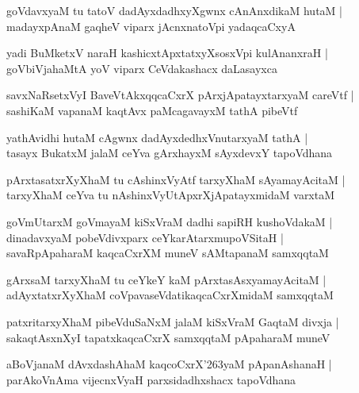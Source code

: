 \begin{shloka}
goVdavxyaM tu tatoV dadAyxdadhxyXgwnx cAnAnxdikaM hutaM |\\
madayxpAnaM gaqheV viparx jAcnxnatoVpi yadaqcaCxyA 
\end{shloka}

\begin{shloka}
yadi BuMketxV naraH kashicxtApxtatxyXsosxVpi kulAnanxraH |\\
goVbiVja{ha}MtA yoV viparx CeVdakashacx daLasayxca
\end{shloka}

\begin{shloka}
savxNaRsetxVyI BaveVtAkxqqcaCxrX pArxjApatayxtarxyaM careVtf |\\
sashiKaM vapanaM kaqtAvx paMcagavayxM tathA pibeVtf
\end{shloka}

\begin{shloka}
yathAvidhi hutaM cAgwnx dadAyxdedhxVnutarxyaM tathA |\\
tasayx BukatxM jalaM ceYva gArxhayxM sAyxdevxY tapoVdhana
\end{shloka}

\begin{shloka}
pArxtasatxrXyXhaM tu cAshinxVyAtf tarxyXhaM sAyamayAcitaM |\\
tarxyXhaM ceYva tu nAshinxVyUtApxrXjApatayxmidaM varxtaM
\end{shloka}

\begin{shloka}
goVmUtarxM goVmayaM kiSxVraM dadhi sapiRH kushoVdakaM |\\
dinadavxyaM pobeVdivxparx ceYkarAtarxmupoVSitaH |\\
savaRpApaharaM kaqcaCxrXM muneV sAMtapanaM samxqqtaM
\end{shloka}

\begin{shloka}
gArxsaM tarxyXhaM tu ceYkeY kaM pArxtasAsxyamayAcitaM |\\
adAyxtatxrXyXhaM coVpavaseVdatikaqcaCxrXmidaM samxqqtaM
\end{shloka}

\begin{shloka}
patxritarxyXhaM pibeVduSaNxM jalaM kiSxVraM GaqtaM divxja |\\
sakaqtAsxnXyI tapatxkaqcaCxrX samxqqtaM pApaharaM muneV 
\end{shloka}

\begin{shloka}
aBoVjanaM dAvxdashAhaM kaqcoCxrX\char'263yaM pApanAshanaH |\\
parAkoVnAma vijecnxVyaH parxsidadhxshacx tapoVdhana
\end{shloka}

